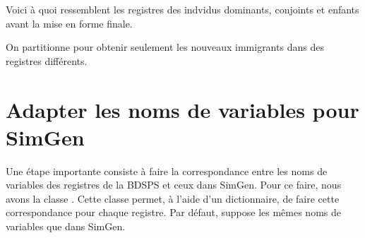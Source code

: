 \documentclass[letterpaper,10pt,french]{sphinxmanual}
\begin{document}
Voici à quoi ressemblent les registres des indvidus dominants, conjoints et enfants avant la mise en forme finale.

\begin{sphinxVerbatim}[commandchars=\\\{\}]
\end{sphinxVerbatim}



\begin{sphinxVerbatim}[commandchars=\\\{\}]
\end{sphinxVerbatim}



\begin{sphinxVerbatim}[commandchars=\\\{\}]
\end{sphinxVerbatim}



On partitionne pour obtenir seulement les nouveaux immigrants dans des registres différents.

\begin{sphinxVerbatim}[commandchars=\\\{\}]
  \PYG{p}{[}\PYG{p}{]}
  
  \PYG{p}{[}\PYG{p}{]}
  \PYG{p}{[}\PYG{p}{]}
\end{sphinxVerbatim}


\section{Adapter les noms de variables pour SimGen}
\label{\detokenize{import:adapter-les-noms-de-variables-pour-simgen}}
Une étape importante consiste à faire la correspondance entre les noms de variables des registres de la BDSPS et ceux dans SimGen. Pour ce faire, nous avons la classe . Cette classe permet, à l’aide d’un dictionnaire, de faire cette correspondance pour chaque registre. Par défaut,  suppose les mêmes noms de variables que dans SimGen.
\end{document}
